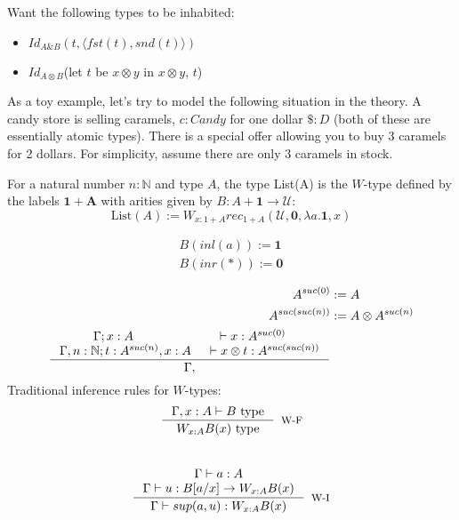 %
Want the following types to be inhabited:
\begin{itemize}
\item $Id_{A\&B}(t, \langle fst(t), snd(t) \rangle)$
\item $Id_{A\otimes B}$(let $t$ be $x \otimes y$ in $x \otimes y$, $t$)
\end{itemize}
As a toy example, let's try to model the following situation in the theory. A candy store is selling caramels, $c : Candy$ for one dollar $\$ : D$ (both of these are essentially atomic types). There is a special offer allowing you to buy 3 caramels for 2 dollars. For simplicity, assume there are only 3 caramels in stock.\\
\begin{defn}
  For a natural number $n : \mathbb{N}$ and type $A$, the type List(A) is the $W$-type defined by the labels $\mathbf{\mathbf{1} + A}$ with arities given by $B : A + \mathbf{1} \to \mathcal{U}$:
  \[
  \text{List}(A) := W_{x : 1 + A}rec_{1 + A}(\mathcal{U}, \mathbf{0}, \lambda a. \mathbf{1}, x)
  \]
\end{defn}
  \[
  \begin{split}
    B(inl(a)) := \mathbf{1}\\
    B(inr(*)) := \mathbf{0}\\
  \end{split}
\]
\[
\begin{split}
A^{suc(0)} &:= A\\
A^{suc(suc(n))} &:= A \otimes A^{suc(n)}\\
\inference{
\Gamma; x : A &\vdash x : A^{suc(0)}\\
\Gamma, n : \mathbb{N}; t : A^{suc(n)}, x : A &\vdash x \otimes t : A^{suc(suc(n))}}
{\Gamma, }
\end{split}
\]
Traditional inference rules for $W$-types:
\[
\inference{\Gamma, x : A \vdash B \text{ type}}
{W_{x : A}B(x) \text{ type}}[W-F]
\]\\
\[
\begin{split}
  \inference{\Gamma \vdash a : A\\
    \Gamma \vdash u : B[a/x] \to W_{x : A}B(x)}
    {\Gamma \vdash sup(a, u) : W_{x : A}B(x)}[W-I]
\end{split}
\]\\
